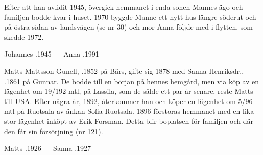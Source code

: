Efter att han avlidit 1945, övergick hemmanet i enda sonen Mannes ägo och familjen bodde kvar i huset. 1970 byggde Manne ett nytt hus längre söderut och på östra sidan av landsvägen (se nr 30) och mor Anna följde med i flytten, som skedde 1972.
\begin{jhchildren}
  \item {}
  \item {}
  \item {}
  \item {}
  \item {}
  \item {}
  \item {}
\end{jhchildren}

Johannes .1945  ---  Anna .1991


Matts Mattsson Gunell, .1852 på Bärs, gifte sig 1878 med Sanna Henriksdr., .1861 på Gunnar. De bodde till en början på hennes hemgård, men via köp av en lägenhet om 19/192 mtl, på  Lassila, som de sålde ett par år senare, reste Matts till USA. Efter några år, 1892, återkommer han och köper en lägenhet om 5/96 mtl på Ruotsala av änkan Sofia Ruotsala. 1896 förstoras hemmanet med en lika stor lägenhet inköpt av Erik Forsman. Detta blir boplatsen för familjen och där den får sin försörjning (nr 121).
\begin{jhchildren}
  \item {}
  \item {}
  \item {}
  \item {}
  \item {}
  \item {}
  \item {}
  \item {}
  \item {}
  \item {}
\end{jhchildren}
Matts .1926  ---  Sanna .1927

